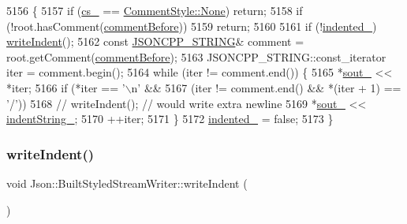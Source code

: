 \begin{DoxyCode}
5156                                                                        \{
5157   \textcolor{keywordflow}{if} (\hyperlink{struct_json_1_1_built_styled_stream_writer_a89a9c76c7531143b52785861ba21c1d4}{cs\_} == \hyperlink{struct_json_1_1_comment_style_a51fc08f3518fd81eba12f340d19a3d0cac8b32a8bae63414c8647d4919da8d437}{CommentStyle::None}) \textcolor{keywordflow}{return};
5158   \textcolor{keywordflow}{if} (!root.hasComment(\hyperlink{namespace_json_a4fc417c23905b2ae9e2c47d197a45351a52f1733775460517b2ea6bedf4906d52}{commentBefore}))
5159     \textcolor{keywordflow}{return};
5160 
5161   \textcolor{keywordflow}{if} (!\hyperlink{struct_json_1_1_built_styled_stream_writer_a6aa0ad023e623f600103631a6bca6d10}{indented\_}) \hyperlink{struct_json_1_1_built_styled_stream_writer_a2b38a3714d415c4bd3b4812897130f3d}{writeIndent}();
5162   \textcolor{keyword}{const} \hyperlink{json_8h_a1e723f95759de062585bc4a8fd3fa4be}{JSONCPP\_STRING}& comment = root.getComment(\hyperlink{namespace_json_a4fc417c23905b2ae9e2c47d197a45351a52f1733775460517b2ea6bedf4906d52}{commentBefore});
5163   JSONCPP\_STRING::const\_iterator iter = comment.begin();
5164   \textcolor{keywordflow}{while} (iter != comment.end()) \{
5165     *\hyperlink{class_json_1_1_stream_writer_a4f5603d4228a9fa46a42cb44e5234d9b}{sout\_} << *iter;
5166     \textcolor{keywordflow}{if} (*iter == \textcolor{charliteral}{'\(\backslash\)n'} &&
5167        (iter != comment.end() && *(iter + 1) == \textcolor{charliteral}{'/'}))
5168       \textcolor{comment}{// writeIndent();  // would write extra newline}
5169       *\hyperlink{class_json_1_1_stream_writer_a4f5603d4228a9fa46a42cb44e5234d9b}{sout\_} << \hyperlink{struct_json_1_1_built_styled_stream_writer_a0f8115a4fb474ab0e9de25f10e5ca09a}{indentString\_};
5170     ++iter;
5171   \}
5172   \hyperlink{struct_json_1_1_built_styled_stream_writer_a6aa0ad023e623f600103631a6bca6d10}{indented\_} = \textcolor{keyword}{false};
5173 \}
\end{DoxyCode}
\mbox{\label{struct_json_1_1_built_styled_stream_writer_a2b38a3714d415c4bd3b4812897130f3d}} 
\subsubsection{\texorpdfstring{write\+Indent()}{writeIndent()}}
{\footnotesize\ttfamily void Json\+::\+Built\+Styled\+Stream\+Writer\+::write\+Indent (\begin{DoxyParamCaption}{ }\end{DoxyParamCaption})\hspace{0.3cm}{\ttfamily [private]}}




